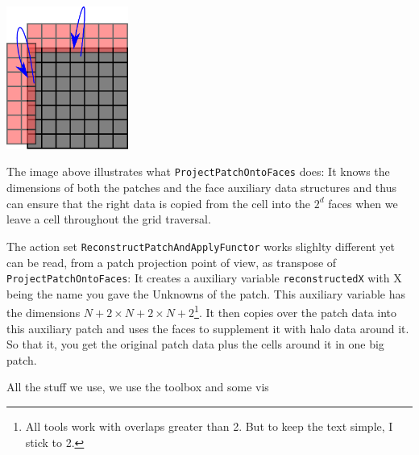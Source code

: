 \begin{center}
  \includegraphics[width=0.3\textwidth]{42_finite-volumes/ProjectPatchOntoFaces.pdf}
\end{center}


\noindent
The image above illustrates what \texttt{ProjectPatchOntoFaces} does:
It knows the dimensions of both the patches and the face auxiliary data
structures and thus can ensure that the right data is copied from the cell into
the $2^d$ faces when we leave a cell throughout the grid traversal.



The action set \texttt{ReconstructPatchAndApplyFunctor} works slighlty different
yet can be read, from a patch projection point of view, as transpose of
\texttt{ProjectPatchOntoFaces}:
It creates a auxiliary variable \texttt{reconstructedX} with X being the name
you gave the Unknowns of the patch.
This auxiliary variable has the dimensions 
$N+2 \times N+2 \times N+2$\footnote{All tools work with overlaps greater than
2. But to keep the text simple, I stick to 2.}.
It then copies over the patch data into this auxiliary patch and uses the faces
to supplement it with halo data around it.
So that it, you get the original patch data plus the cells around it in one big
patch.


 All the stuff we use, we use the toolbox and some vis

% 
